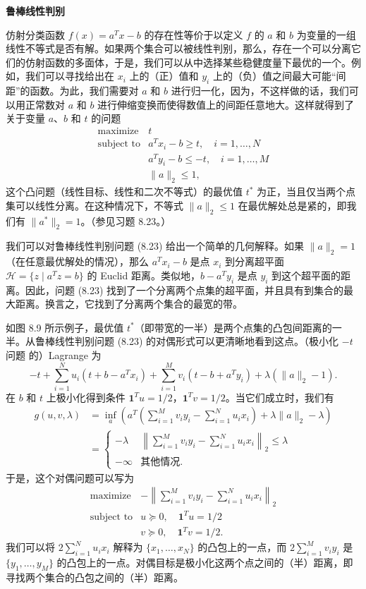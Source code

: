 \documentclass[UTF8,12pt,a4paper,fontset=fandol]{ctexart}
\begin{document}
\noindent\textbf{鲁棒线性判别}

仿射分类函数 $f(x)=a^Tx-b$ 的存在性等价于以定义 $f$ 的 $a$ 和 $b$ 为变量的一组线性不等式是否有解。如果两个集合可以被线性判别，那么，存在一个可以分离它们的仿射函数的多面体，于是，我们可以从中选择某些稳健度量下最优的一个。例如，我们可以寻找给出在 $x_i$ 上的（正）值和 $y_i$ 上的（负）值之间最大可能“间距”的函数。为此，我们需要对 $a$ 和 $b$ 进行归一化，因为，不这样做的话，我们可以用正常数对 $a$ 和 $b$ 进行伸缩变换而使得数值上的间距任意地大。这样就得到了关于变量 $a$、$b$ 和 $t$ 的问题
\[
\begin{array}{ll}
\mbox{maximize} & t\\
\mbox{subject to} & a^Tx_i-b\geq t,\quad i=1,\ldots,N\\
& a^Ty_i-b\leq -t,\quad i=1,\ldots,M\\
& \|a\|_2\leq 1,
\end{array}
\tag{8.23}
\]
这个凸问题（线性目标、线性和二次不等式）的最优值 $t^*$ 为正，当且仅当两个点集可以线性分离。在这种情况下，不等式 $\|a\|_2\leq 1$ 在最优解处总是紧的，即我们有 $\|a^*\|_2=1$。（参见习题 8.23。）

我们可以对鲁棒线性判别问题 (8.23) 给出一个简单的几何解释。如果 $\|a\|_2=1$（在任意最优解处的情况），那么 $a^Tx_i-b$ 是点 $x_i$ 到分离超平面 $\mathcal{H}=\{z\mid a^Tz=b\}$ 的 Euclid 距离。类似地，$b-a^Ty_i$ 是点 $y_i$ 到这个超平面的距离。因此，问题 (8.23) 找到了一个分离两个点集的超平面，并且具有到集合的最大距离。换言之，它找到了分离两个集合的最宽的带。

如图 8.9 所示例子，最优值 $t^*$（即带宽的一半）是两个点集的凸包间距离的一半。从鲁棒线性判别问题 (8.23) 的对偶形式可以更清晰地看到这点。（极小化 $-t$ 问题
的）Lagrange 为
\[
-t+\sum_{i=1}^N u_i(t+b-a^Tx_i)+\sum_{i=1}^M v_i(t-b+a^Ty_i)+\lambda(\|a\|_2-1).
\]
在 $b$ 和 $t$ 上极小化得到条件 $\mathbf{1}^Tu=1/2$，$\mathbf{1}^Tv=1/2$。当它们成立时，我们有
\[
\begin{split}
g(u,v,\lambda)
&=\inf_a\left(a^T\left(\sum_{i=1}^M v_i y_i-\sum_{i=1}^N u_i x_i\right)+\lambda\|a\|_2-\lambda\right)\\
&=
\begin{cases}
-\lambda & \left\|\displaystyle\sum_{i=1}^M v_i y_i-\sum_{i=1}^N u_i x_i\right\|_2\leq \lambda\\
-\infty & \mbox{其他情况}.
\end{cases}
\end{split}
\]
于是，这个对偶问题可以写为
\[
\begin{array}{ll}
\mbox{maximize} & -\left\|\displaystyle\sum_{i=1}^M v_i y_i-\sum_{i=1}^N u_i x_i\right\|_2\\
\mbox{subject to} & u\succeq 0,\quad \mathbf{1}^Tu=1/2\\
& v\succeq 0,\quad \mathbf{1}^Tv=1/2.
\end{array}
\]
我们可以将 $2\sum_{i=1}^N u_i x_i$ 解释为 $\{x_1,\ldots,x_N\}$ 的凸包上的一点，而 $2\sum_{i=1}^M v_i y_i$ 是 $\{y_1,\ldots,y_M\}$ 的凸包上的一点。对偶目标是极小化这两个点之间的（半）距离，即寻找两个集合的凸包之间的（半）距离。
\end{document}
